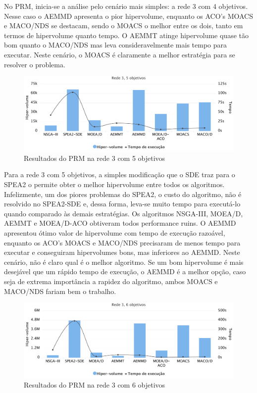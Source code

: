 No PRM, inicia-se a análise pelo cenário mais simples: a rede 3 com 4 objetivos. Nesse caso o AEMMD apresenta o pior hipervolume, enquanto os ACO's MOACS e MACO/NDS se destacam, sendo o MOACS o melhor entre os dois, tanto em termos de hipervolume quanto tempo. O AEMMT atinge hipervolume quase tão bom quanto o MACO/NDS mas leva consideravelmente mais tempo para executar. Neste cenário, o MOACS é claramente a melhor estratégia para se resolver o problema.

\begin{figure}[!htbp]
	\includegraphics[width=1\textwidth]{cap_experimentos/figs/etapa4/r3o5}
	\caption{\label{fig_exp4_r3o5}Resultados do PRM na rede 3 com 5 objetivos}
\end{figure}

Para a rede 3 com 5 objetivos, a simples modificação que o SDE traz para o SPEA2 o permite obter o melhor hipervolume entre todos os algoritmos. Infelizmente, um dos piores problemas do SPEA2, o custo do algoritmo, não é resolvido no SPEA2-SDE e, dessa forma, leva-se muito tempo para executá-lo quando comparado às demais estratégias. Os algoritmos NSGA-III, MOEA/D, AEMMT e MOEA/D-ACO obtiveram todos performance ruins. O AEMMD apresentou ótimo valor de hipervolume com tempo de execução razoável, enquanto os ACO's MOACS e MACO/NDS precisaram de menos tempo para executar e conseguiram hipervolumes bons, mas inferiores ao AEMMD. Neste cenário, não é claro qual é o melhor algoritmo. Se um bom hipervolume é mais desejável que um rápido tempo de execução, o AEMMD é a melhor opção, caso seja de extrema importância a rapidez do algoritmo, ambos MOACS e MACO/NDS fariam bem o trabalho.

\begin{figure}[!htbp]
	\includegraphics[width=1\textwidth]{cap_experimentos/figs/etapa4/r3o6}
	\caption{\label{fig_exp4_r3o6}Resultados do PRM na rede 3 com 6 objetivos}
\end{figure}

